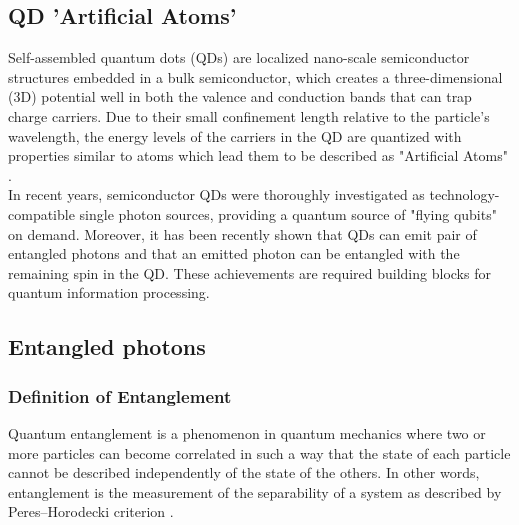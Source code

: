 \subsection{QD 'Artificial Atoms'}
Self-assembled quantum dots (QDs) are localized nano-scale semiconductor structures embedded in a bulk semiconductor, which creates a three-dimensional (3D) potential well in both the valence and conduction bands that can trap charge carriers. Due to their small confinement length relative to the particle's wavelength, the energy levels of the carriers in the QD are quantized with properties similar to atoms which lead them to be described as "Artificial Atoms" \cite{Kastner1993}.\\
%
In recent years, semiconductor QDs were thoroughly investigated as technology-compatible single photon sources, providing a quantum source of "flying qubits" on demand.\cite{Dekel2000,Michler2000,Michler2000_1,Yuan2002}
Moreover, it has been recently shown that QDs can emit pair of entangled photons \cite{Akopian2006,Hafenbrak2007} and that an emitted photon can be entangled with the remaining spin in the QD.\cite{Pelk2012,Schaibley2013,Gao2012}
These achievements are required building blocks for quantum information processing.\cite{DiVincenzo1998,Duan2001}
%
\subsection{Entangled photons}
\subsubsection{Definition of Entanglement}
Quantum entanglement is a phenomenon in quantum mechanics where two or more particles can become correlated in such a way that the state of each particle cannot be described independently of the state of the others. 
 In other words, entanglement is the measurement of the separability of a system as described by Peres–Horodecki criterion \cite{Peres1996}.
 
